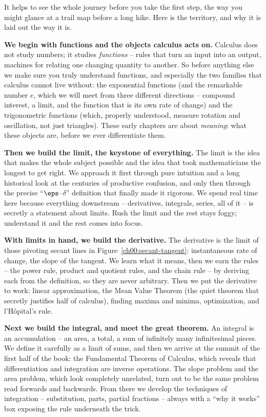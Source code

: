 It helps to see the whole journey before you take the first step, the way you might glance at a
trail map before a long hike. Here is the territory, and why it is laid out the way it is.

\textbf{We begin with functions and the objects calculus acts on.} Calculus does not study numbers;
it studies \emph{functions} -- rules that turn an input into an output, machines for relating one
changing quantity to another. So before anything else we make sure you truly understand functions,
and especially the two families that calculus cannot live without: the exponential functions
(and the remarkable number $e$, which we will meet from three different directions -- compound
interest, a limit, and the function that is its own rate of change) and the trigonometric functions
(which, properly understood, measure rotation and oscillation, not just triangles). These early
chapters are about \emph{meaning}: what these objects are, before we ever differentiate them.

\textbf{Then we build the limit, the keystone of everything.} The limit is the idea that makes the
whole subject possible and the idea that took mathematicians the longest to get right. We approach
it first through pure intuition and a long historical look at the centuries of productive confusion,
and only then through the precise ``$\eps$--$\delta$'' definition that finally made it rigorous. We
spend real time here because everything downstream -- derivatives, integrals, series, all of it --
is secretly a statement about limits. Rush the limit and the rest stays foggy; understand it and the
rest comes into focus.

\textbf{With limits in hand, we build the derivative.} The derivative is the limit of those pivoting
secant lines in Figure~\ref{ch00:secant-tangent}: instantaneous rate of change, the slope of the
tangent. We learn what it means, then we earn the rules -- the power rule, product and quotient
rules, and the chain rule -- by deriving each from the definition, so they are never arbitrary. Then
we put the derivative to work: linear approximation, the Mean Value Theorem (the quiet theorem that
secretly justifies half of calculus), finding maxima and minima, optimization, and l'H\^opital's
rule.

\textbf{Next we build the integral, and meet the great theorem.} An integral is an accumulation -- an
area, a total, a sum of infinitely many infinitesimal pieces. We define it carefully as a limit of
sums, and then we arrive at the summit of the first half of the book: the Fundamental Theorem of
Calculus, which reveals that differentiation and integration are inverse operations. The slope
problem and the area problem, which look completely unrelated, turn out to be the same problem read
forwards and backwards. From there we develop the techniques of integration -- substitution, parts,
partial fractions -- always with a ``why it works'' box exposing the rule underneath the trick.


